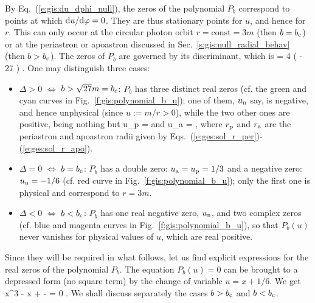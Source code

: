 By Eq.~(\ref{e:gis:du_dphi_null}), the zeros of the polynomial $P_b$
correspond to points at which $\mathrm{d} u /\mathrm{d}\varphi = 0$. They are thus stationary points
for $u$, and hence for $r$. This can only occur at the circular photon
orbit $r = \mathrm{const} = 3 m$ (then $b=b_{\rm c}$)
or at the periastron or apoastron discussed
in Sec.~\ref{s:gis:null_radial_behav} (then $b > b_{\rm c}$).
The zeros of $P_b$ are governed by its
discriminant, which is
\be
    \Delta = 4  \left(  - 27 \right) .
\ee
One may distinguish three cases:
\begin{itemize}
\item $\Delta>0$ $\iff$ $b > \sqrt{27} m = b_{\rm c}$: $P_b$ has three distinct
real zeros (cf. the green and cyan curves
in Fig.~\ref{f:gis:polynomial_b_u}); one of them, $u_{\rm n}$ say, is
negative, and hence unphysical (since $u:=m/r >0$),
while the two other ones are positive, being nothing but
\be \label{e:ges:def_u_per_apo}
    u_{\rm p} =  \qquad\mbox{and}\qquad
    u_{\rm a} =  ,
\ee
where $r_{\rm p}$ and $r_{\rm a}$ are the periastron and apoastron radii given by
Eqs.~(\ref{e:ges:sol_r_per})-(\ref{e:ges:sol_r_apo}).
\item $\Delta=0$ $\iff$ $b = b_{\rm c}$: $P_b$
has a double zero: $u_{\rm a} = u_{\rm p} =1/3$ and a negative zero:
$u_{\rm n}=-1/6$ (cf. red curve
in Fig.~\ref{f:gis:polynomial_b_u}); only the first
one is physical and correspond to $r=3m$.
\item $\Delta<0$ $\iff$ $b < b_{\rm c}$:
$P_b$ has one real negative zero, $u_{\rm n}$, and two complex zeros
(cf. blue and magenta curves in Fig.~\ref{f:gis:polynomial_b_u}),
so that $P_b(u)$ never vanishes
for physical values of $u$, which are real positive.
\end{itemize}

Since they will be required in what follows, let us
find explicit expressions for the real zeros of the polynomial $P_b$.
The equation $P_b(u) = 0$ can be brought to a depressed form (no square term)
by the change of variable $u = x + 1/6$. We get
\be \label{e:gis:zeros_Pb_eq_in_x}
    x^3 -  x +  -  = 0 .
\ee
We shall discuss separately the cases $b>b_{\rm c}$ and $b<b_{\rm c}$.

